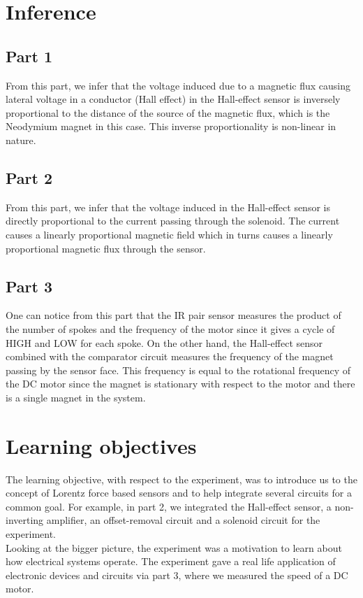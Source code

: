 \documentclass[12pt]{article}
\begin{document}
\section{Inference}

\subsection{Part 1}

From this part, we infer that the voltage induced due to a magnetic flux causing lateral voltage in a conductor (Hall effect) in the Hall-effect sensor is inversely proportional to the distance of the source of the magnetic flux, which is the Neodymium magnet in this case. This inverse proportionality is non-linear in nature.

\subsection{Part 2}

From this part, we infer that the voltage induced in the Hall-effect sensor is directly proportional to the current passing through the solenoid. The current causes a linearly proportional magnetic field which in turns causes a linearly proportional magnetic flux through the sensor.

\subsection{Part 3}

One can notice from this part that the IR pair sensor measures the product of the number of spokes and the frequency of the motor since it gives a cycle of HIGH and LOW for each spoke. On the other hand, the Hall-effect sensor combined with the comparator circuit measures the frequency of the magnet passing by the sensor face. This frequency is equal to the rotational frequency of the DC motor since the magnet is stationary with respect to the motor and there is a single magnet in the system.

\section{Learning objectives}

The learning objective, with respect to the experiment, was to introduce us to the concept of Lorentz force based sensors and to help integrate several circuits for a common goal. For example, in part 2, we integrated the Hall-effect sensor, a non-inverting amplifier, an offset-removal circuit and a solenoid circuit for the experiment.\\
Looking at the bigger picture, the experiment was a motivation to learn about how electrical systems operate. The experiment gave a real life application of electronic devices and circuits via part 3, where we measured the speed of a DC motor.
\end{document}
